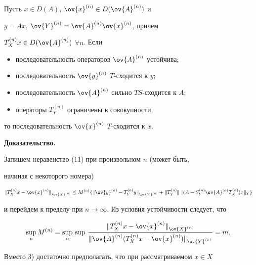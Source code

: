 \begin{thm}


Пусть $x\in D(A)$, $\ov{x}^{(n)}\in D(\ov{A}^{(n)})$ и


$y=Ax$, $\ov{Y}^{(n)}=\ov{A}^{(n)}\ov{x}^{(n)}$, причем


$T^{(n)}_Xx\in D(\ov{A}^{(n)})$ $\forall n$. Если


\begin{itemize}


\item[1)] последовательность операторов $\ov{A}^{(n)}$ устойчива$;$


\item[2)] последовательность $\ov{y}^{(n)}$\; $T$-сходится к $y;$


\item[3)] последовательность $\ov{A}^{(n)}$ сильно $TS$-сходится к $A;$


\item[4)] операторы $T^{(n)}_Y$ ограничены в совокупности,


\end{itemize}


то последовательность $\ov{x}^{(n)}$\; $T$-сходится к $x$.


\end{thm}





{\bf Доказательство.}


Запишем неравенство (11) при произвольном $n$ (может быть,


начиная с некоторого номера)


$$


\nr{T^{(n)}_Xx-\ov{x}^{(n)}}_{\ov{X}^{(n)}} \le


M^{(n)} \{ \nr{\ov{y}^{(n)}-T^{(n)}_Yy}_{\ov{Y}^{(n)}}


+ \nr{T^{(n)}_Y}\,\nr{(A-S^{(n)}_Y\ov{A}^{(n)} T^{(n)}_X)x}_Y \}


$$


и перейдем к пределу при $n\to\infty$. Из условия устойчивости следует, что


$$


\sup_{n}M^{(n)} = \sup_{n}\,\sup\,


\frac{\nr{T^{(n)}_Xx-\ov{x}^{(n)}}_{\ov{X}^{(n)}}}


{\nr{\ov{A}^{(n)}(T^{(n)}_X x-\ov{x}^{(n)})}_{\ov{Y}^{(n)}}} = m.


$$


Вместо 3) достаточно предполагать, что при рассматриваемом $x\in X$


